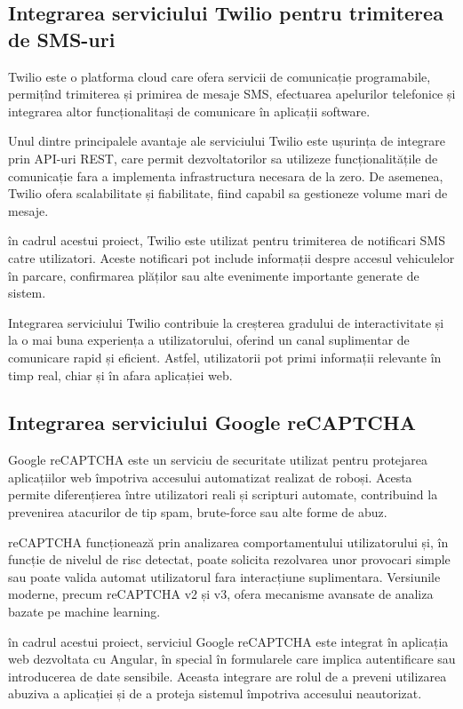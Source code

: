 \subsection*{Integrarea serviciului Twilio pentru trimiterea de SMS-uri}

Twilio este o platforma cloud care ofera servicii de comunicație programabile, permițînd trimiterea și primirea de mesaje SMS, efectuarea apelurilor telefonice și integrarea altor funcționalitași de comunicare în aplicații software.

Unul dintre principalele avantaje ale serviciului Twilio este ușurința de integrare prin API-uri REST, care permit dezvoltatorilor sa utilizeze funcționalitățile de comunicație fara a implementa infrastructura necesara de la zero. De asemenea, Twilio ofera scalabilitate și fiabilitate, fiind capabil sa gestioneze volume mari de mesaje.

în cadrul acestui proiect, Twilio este utilizat pentru trimiterea de notificari SMS catre utilizatori. Aceste notificari pot include informații despre accesul vehiculelor în parcare, confirmarea plăților sau alte evenimente importante generate de sistem.

Integrarea serviciului Twilio contribuie la creșterea gradului de interactivitate și la o mai buna experiența a utilizatorului, oferind un canal suplimentar de comunicare rapid și eficient. Astfel, utilizatorii pot primi informații relevante în timp real, chiar și în afara aplicației web.

\subsection*{Integrarea serviciului Google reCAPTCHA}

Google reCAPTCHA este un serviciu de securitate utilizat pentru protejarea aplicațiilor web împotriva accesului automatizat realizat de roboși. Acesta permite diferențierea între utilizatori reali și scripturi automate, contribuind la prevenirea atacurilor de tip spam, brute-force sau alte forme de abuz.

reCAPTCHA funcționează prin analizarea comportamentului utilizatorului și, în funcție de nivelul de risc detectat, poate solicita rezolvarea unor provocari simple sau poate valida automat utilizatorul fara interacțiune suplimentara. Versiunile moderne, precum reCAPTCHA v2 și v3, ofera mecanisme avansate de analiza bazate pe machine learning.

în cadrul acestui proiect, serviciul Google reCAPTCHA este integrat în aplicația web dezvoltata cu Angular, în special în formularele care implica autentificare sau introducerea de date sensibile. Aceasta integrare are rolul de a preveni utilizarea abuziva a aplicației și de a proteja sistemul împotriva accesului neautorizat.

